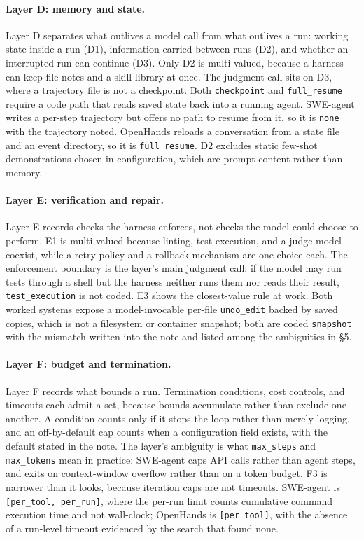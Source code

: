 \paragraph{Layer D: memory and state.}\label{subsec:layer-d}
Layer D separates what outlives a model call from what outlives a run: working state inside a run (D1),
information carried between runs (D2), and whether an interrupted run can continue (D3). Only D2 is
multi-valued, because a harness can keep file notes and a skill library at once. The judgment call sits
on D3, where a trajectory file is not a checkpoint. Both \texttt{checkpoint} and \texttt{full\_resume}
require a code path that reads saved state back into a running agent. SWE-agent writes a per-step
trajectory but offers no path to resume from it, so it is \texttt{none} with the trajectory noted.
OpenHands reloads a conversation from a state file and an event directory, so it is
\texttt{full\_resume}. D2 excludes static few-shot demonstrations chosen in configuration, which are
prompt content rather than memory.


\paragraph{Layer E: verification and repair.}\label{subsec:layer-e}
Layer E records checks the harness enforces, not checks the model could choose to perform. E1 is
multi-valued because linting, test execution, and a judge model coexist, while a retry policy and a
rollback mechanism are one choice each. The enforcement boundary is the layer's main judgment call: if
the model may run tests through a shell but the harness neither runs them nor reads their result,
\texttt{test\_execution} is not coded. E3 shows the closest-value rule at work. Both worked systems
expose a model-invocable per-file \texttt{undo\_edit} backed by saved copies, which is not a filesystem
or container snapshot; both are coded \texttt{snapshot} with the mismatch written into the note and
listed among the ambiguities in \S5.


\paragraph{Layer F: budget and termination.}\label{subsec:layer-f}
Layer F records what bounds a run. Termination conditions, cost controls, and timeouts each admit a
set, because bounds accumulate rather than exclude one another. A condition counts only if it stops the
loop rather than merely logging, and an off-by-default cap counts when a configuration field exists,
with the default stated in the note. The layer's ambiguity is what \texttt{max\_steps} and
\texttt{max\_tokens} mean in practice: SWE-agent caps API calls rather than agent steps, and exits on
context-window overflow rather than on a token budget. F3 is narrower than it looks, because iteration
caps are not timeouts. SWE-agent is \texttt{[per\_tool, per\_run]}, where the per-run limit counts
cumulative command execution time and not wall-clock; OpenHands is \texttt{[per\_tool]}, with the
absence of a run-level timeout evidenced by the search that found none.

